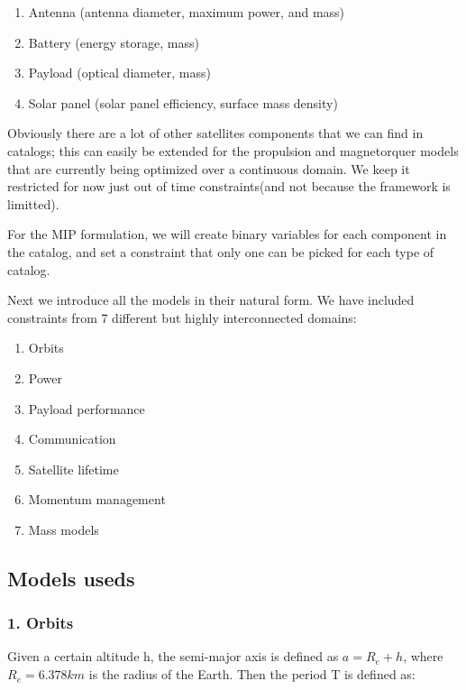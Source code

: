 \documentclass[11pt]{article}
\providecommand{\tightlist}{%
      \setlength{\itemsep}{0pt}\setlength{\parskip}{0pt}}
\begin{document}
\begin{enumerate}
\def\labelenumi{\arabic{enumi}.}
\tightlist
\item
  Antenna (antenna diameter, maximum power, and mass)
\item
  Battery (energy storage, mass)
\item
  Payload (optical diameter, mass)
\item
  Solar panel (solar panel efficiency, surface mass density)
\end{enumerate}

Obviously there are a lot of other satellites components that we can
find in catalogs; this can easily be extended for the propulsion and
magnetorquer models that are currently being optimized over a continuous
domain. We keep it restricted for now just out of time constraints(and
not because the framework is limitted).

For the MIP formulation, we will create binary variables for each
component in the catalog, and set a constraint that only one can be
picked for each type of catalog.

Next we introduce all the models in their natural form. We have included
constraints from 7 different but highly interconnected domains:

\begin{enumerate}
\def\labelenumi{\arabic{enumi}.}
\tightlist
\item
  Orbits
\item
  Power
\item
  Payload performance
\item
  Communication
\item
  Satellite lifetime
\item
  Momentum management
\item
  Mass models
\end{enumerate}

    \hypertarget{models-useds}{%
\subsection{Models useds}\label{models-useds}}

\hypertarget{orbits}{%
\subsubsection{1. Orbits}\label{orbits}}

Given a certain altitude h, the semi-major axis is defined as
\(a = R_e + h\), where \(R_e = 6.378km\) is the radius of the Earth.
Then the period T is defined as:
\end{document}
